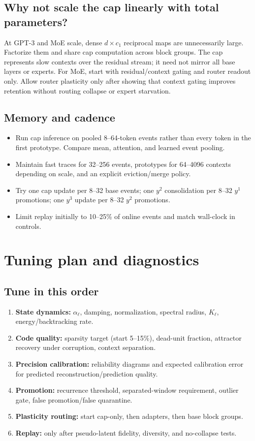 \documentclass[10pt]{article}
\begin{document}
\subsection{Why not scale the cap linearly with total parameters?}
At GPT-3 and MoE scale, dense $d\times c_1$ reciprocal maps are unnecessarily large.
Factorize them and share cap computation across block groups.  The cap represents slow
contexts over the residual stream; it need not mirror all base layers or experts.  For MoE,
start with residual/context gating and router readout only.  Allow router plasticity only after
showing that context gating improves retention without routing collapse or expert starvation.

\subsection{Memory and cadence}
\begin{itemize}
  \item Run cap inference on pooled 8--64-token events rather than every token in the first
  prototype.  Compare mean, attention, and learned event pooling.
  \item Maintain fast traces for 32--256 events, prototypes for 64--4096 contexts depending
  on scale, and an explicit eviction/merge policy.
  \item Try one cap update per 8--32 base events; one $y^2$ consolidation per 8--32 $y^1$
  promotions; one $y^3$ update per 8--32 $y^2$ promotions.
  \item Limit replay initially to 10--25\% of online events and match wall-clock in controls.
\end{itemize}

\section{Tuning plan and diagnostics}
\subsection{Tune in this order}
\begin{enumerate}
  \item \textbf{State dynamics:} $\alpha_\ell$, damping, normalization, spectral radius,
  $K_\ell$, energy/backtracking rate.
  \item \textbf{Code quality:} sparsity target (start 5--15\%), dead-unit fraction, attractor
  recovery under corruption, context separation.
  \item \textbf{Precision calibration:} reliability diagrams and expected calibration error
  for predicted reconstruction/prediction quality.
  \item \textbf{Promotion:} recurrence threshold, separated-window requirement, outlier gate,
  false promotion/false quarantine.
  \item \textbf{Plasticity routing:} start cap-only, then adapters, then base block groups.
  \item \textbf{Replay:} only after pseudo-latent fidelity, diversity, and no-collapse tests.
\end{enumerate}
\end{document}

